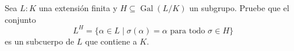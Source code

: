 Sea $L:K$ una extensión finita y $H\subseteq\operatorname{Gal}(L/K)$ un subgrupo. Pruebe que el conjunto
\[L^{H}=\{\alpha\in L\mid \sigma(\alpha)=\alpha\text{ para todo }\sigma\in H\}\]
es un subcuerpo de $L$ que contiene a $K$.
